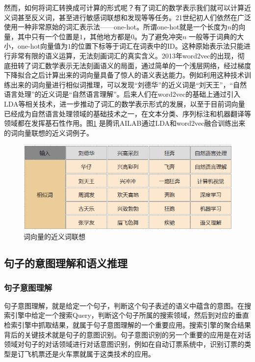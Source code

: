 \documentclass[twoside,a4paper,12pt]{book}%
\begin{document}
然而，如何将词汇转换成可计算的形式呢？有了词汇的数学表示我们就可以计算近义词甚至反义词，甚至进行敏感词联想和发现等等任务。21世纪初人们依然在广泛使用一种非常原始的词汇表示法——one-hot。所谓one-hot就是一个长度为$n$的向量，其中只有一个位置是$1$，其他地方都是$0$。为了避免冲突$n$
一般等于词典的大小，one-hot向量值为$1$的位置下标等于词汇在词表中的ID。这种原始表示法只能进行非常有限的语义运算，无法刻画词汇的真实含义。2013年word2vec的出现，彻底扭转了词汇数学表示无法刻画语义的局面，通过简单的一个浅层网络，经过梯度下降拟合之后计算出来的词向量具备了惊人的语义表达能力。例如利用这种技术训练出来的词向量进行相似词推理，可以发现“刘德华”的近义词是“刘天王”，“自然语言处理”的近义词是“自然语言理解”。后来人们在word2vec的基础上通过引入\gls{LDA}等相关技术，进一步推动了词汇的数学表示形式的发展，以至于目前词向量已经成为自然语言处理领域的基础技术之一，在文本分类、序列标注和机器翻译等领域都在发挥基石性作用。图\ref{fig:history1.png} 是腾讯AILAB通过\gls{LDA}和word2vec融合训练出来的词向量联想的近义词例子。
\begin{figure}[htbp]
\begin{center}
\includegraphics[width=5.5in]{figures/history1.png}
\caption{词向量的近义词联想} \label{fig:history1.png}
\end{center}
\end{figure}

\subsection{句子的意图理解和语义推理}
\subsubsection{句子意图理解}
句子意图理解，就是给定一个句子，判断这个句子表述的语义中蕴含的意图。在搜索引擎中给定一个搜索Query，判断这个句子所属的搜索领域，然后到对应的垂直检索引擎中抓取结果，就属于句子意图理解的一个重要应用。搜索引擎的聚合结果背后的关键技术就是句子的意图识别。句子意图识别的另一个重要的应用是在对话领域对句子的对话领域进行对话意图识别，例如在自动订票系统中，识别订票的类型是订飞机票还是火车票就属于这类技术的应用。
\end{document}
